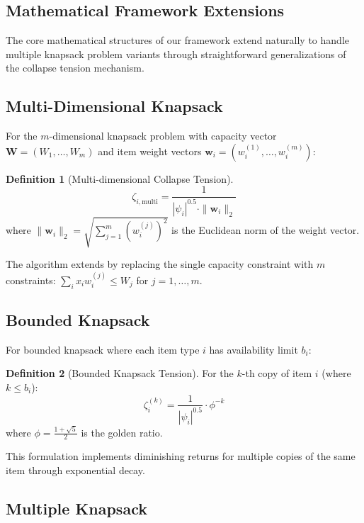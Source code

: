 \documentclass[11pt]{article}
\theoremstyle{remark}
\theoremstyle{definition}
\newtheorem{definition}{Definition}
\begin{document}
\subsection{Mathematical Framework Extensions}

The core mathematical structures of our framework extend naturally to handle multiple knapsack problem variants through straightforward generalizations of the collapse tension mechanism.

\subsection{Multi-Dimensional Knapsack}

For the $m$-dimensional knapsack problem with capacity vector $\mathbf{W} = (W_1, \ldots, W_m)$ and item weight vectors $\mathbf{w}_i = (w_i^{(1)}, \ldots, w_i^{(m)})$:

\begin{definition}[Multi-dimensional Collapse Tension]
\begin{equation}
\zeta_{i,\text{multi}} = \frac{1}{|\psi_i|^{0.5} \cdot \|\mathbf{w}_i\|_2}
\end{equation}
where $\|\mathbf{w}_i\|_2 = \sqrt{\sum_{j=1}^m (w_i^{(j)})^2}$ is the Euclidean norm of the weight vector.
\end{definition}

The algorithm extends by replacing the single capacity constraint with $m$ constraints: $\sum_i x_i w_i^{(j)} \leq W_j$ for $j = 1, \ldots, m$.

\subsection{Bounded Knapsack}

For bounded knapsack where each item type $i$ has availability limit $b_i$:

\begin{definition}[Bounded Knapsack Tension]
For the $k$-th copy of item $i$ (where $k \leq b_i$):
\begin{equation}
\zeta_i^{(k)} = \frac{1}{|\psi_i|^{0.5}} \cdot \phi^{-k}
\end{equation}
where $\phi = \frac{1+\sqrt{5}}{2}$ is the golden ratio.
\end{definition}

This formulation implements diminishing returns for multiple copies of the same item through exponential decay.

\subsection{Multiple Knapsack}
\end{document}

